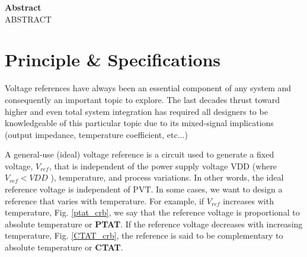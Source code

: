 \documentclass[11pt,a4paper]{report}
\begin{document}

{}
\renewcommand{\contentsname}{Sommaire}
\tableofcontents


% 
% 
% 
% 
% 

\newpage
% 
\vspace{3cm}
\textbf{Abstract} \\
\newline
\hspace*{17pt} ABSTRACT

\newpage
\begin{minipage}{\textwidth}
  \listoffigures
  \listoftables
\end{minipage}

\newpage


\chapter{Principle \& Specifications}

Voltage references have always been an essential component of any system and consequently an important topic to explore. The last decades thrust toward higher and even total system integration has required all designers to be knowledgeable of this particular topic due to its mixed-signal implications (output impedance, temperature coefficient, etc...)


A general-use (ideal) voltage reference is a circuit used to generate a fixed voltage, $V_{ref}$, that is independent of the power supply voltage VDD (where $V_{ref} < VDD$ ), temperature, and process variations. In other words, the ideal reference voltage is independent of PVT. In some cases, we want to design a reference that varies with temperature. For example, if $V_{ref}$ increases with temperature, Fig. \ref{ptat_crb}, we say that the reference voltage is proportional to absolute temperature or \textbf{PTAT}. If the reference voltage decreases with increasing temperature,            Fig. \ref{CTAT_crb}, the reference is said to be complementary to absolute temperature or \textbf{CTAT}. 
\end{document}
